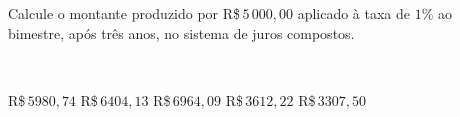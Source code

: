 \parbox{\linewidth}{

Calcule o montante produzido por R\$\,$5\,000{,}00$ aplicado à taxa de $1\%$ ao bimestre, após três anos, no sistema de juros compostos.}\vspace{2mm}\\\parbox{\linewidth}{

R\$\,$   5980{,}74$
R\$\,$   6404{,}13$
R\$\,$   6964{,}09$
R\$\,$   3612{,}22$
R\$\,$   3307{,}50$

}


